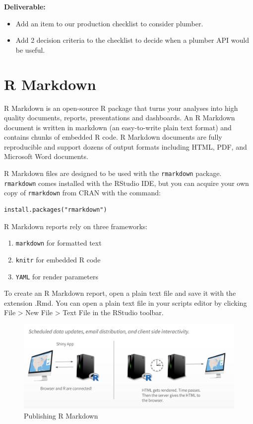 \documentclass[]{book}
\providecommand{\tightlist}{%
  \setlength{\itemsep}{0pt}\setlength{\parskip}{0pt}}
\theoremstyle{definition}
\theoremstyle{definition}
\theoremstyle{definition}
\theoremstyle{remark}
\begin{document}
\textbf{Deliverable:}

\begin{itemize}
\tightlist
\item
  Add an item to our production checklist to consider plumber.
\item
  Add 2 decision criteria to the checklist to decide when a plumber API
  would be useful.
\end{itemize}

\hypertarget{r-markdown}{%
\section{R Markdown}\label{r-markdown}}

R Markdown is an open-source R package that turns your analyses into
high quality documents, reports, presentations and dashboards. An R
Markdown document is written in markdown (an easy-to-write plain text
format) and contains chunks of embedded R code. R Markdown documents are
fully reproducible and support dozens of output formats including HTML,
PDF, and Microsoft Word documents.

R Markdown files are designed to be used with the \texttt{rmarkdown}
package. \texttt{rmarkdown} comes installed with the RStudio IDE, but
you can acquire your own copy of \texttt{rmarkdown} from CRAN with the
command:

\begin{verbatim}
install.packages("rmarkdown")
\end{verbatim}

R Markdown reports rely on three frameworks:

\begin{enumerate}
\def\labelenumi{\arabic{enumi}.}
\tightlist
\item
  \texttt{markdown} for formatted text
\item
  \texttt{knitr} for embedded R code
\item
  \texttt{YAML} for render parameters
\end{enumerate}

To create an R Markdown report, open a plain text file and save it with
the extension .Rmd. You can open a plain text file in your scripts
editor by clicking File \textgreater{} New File \textgreater{} Text File
in the RStudio toolbar.

\begin{figure}
\centering
\includegraphics{imgs/shiny-alt/rmd-diagram.png}
\caption{Publishing R Markdown}
\end{figure}
\end{document}
